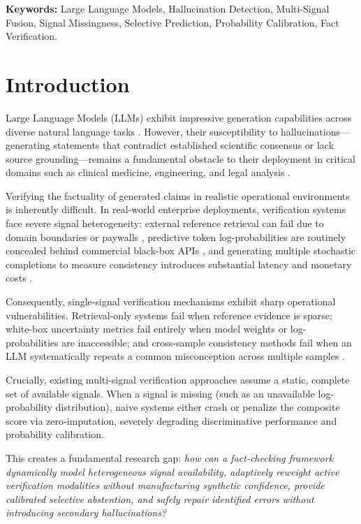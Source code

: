 \documentclass[11pt,a4paper]{article}
\begin{document}
\textbf{Keywords:} Large Language Models, Hallucination Detection, Multi-Signal Fusion, Signal Missingness, Selective Prediction, Probability Calibration, Fact Verification.

\newpage

\section{Introduction}
\label{sec:introduction}
Large Language Models (LLMs) exhibit impressive generation capabilities across diverse natural language tasks \citep{he2021deberta}. However, their susceptibility to hallucinations---generating statements that contradict established scientific consensus or lack source grounding---remains a fundamental obstacle to their deployment in critical domains such as clinical medicine, engineering, and legal analysis \citep{lin2022truthfulqa, li2023halueval}.

Verifying the factuality of generated claims in realistic operational environments is inherently difficult. In real-world enterprise deployments, verification systems face severe signal heterogeneity: external reference retrieval can fail due to domain boundaries or paywalls \citep{thorne2018fever}, predictive token log-probabilities are routinely concealed behind commercial black-box APIs \citep{manakul2023selfcheckgpt}, and generating multiple stochastic completions to measure consistency introduces substantial latency and monetary costs \citep{kuhn2023semantic}.

Consequently, single-signal verification mechanisms exhibit sharp operational vulnerabilities. Retrieval-only systems fail when reference evidence is sparse; white-box uncertainty metrics fail entirely when model weights or log-probabilities are inaccessible; and cross-sample consistency methods fail when an LLM systematically repeats a common misconception across multiple samples \citep{min2023factscore, tang2024minicheck}.

Crucially, existing multi-signal verification approaches assume a static, complete set of available signals. When a signal is missing (such as an unavailable log-probability distribution), naive systems either crash or penalize the composite score via zero-imputation, severely degrading discriminative performance and probability calibration.

This creates a fundamental research gap: \textit{how can a fact-checking framework dynamically model heterogeneous signal availability, adaptively reweight active verification modalities without manufacturing synthetic confidence, provide calibrated selective abstention, and safely repair identified errors without introducing secondary hallucinations?}
\end{document}
